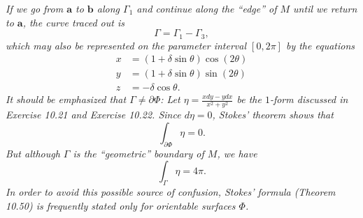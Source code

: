 \documentclass{article}
\begin{document}
\emph{If we go from $\mathbf{a}$ to $\mathbf{b}$ along $\Gamma_1$
and continue along the ``edge'' of $M$ until we return to $\mathbf{a}$,
the curve traced out is
\[
  \Gamma = \Gamma_1 - \Gamma_3,
\]
which may also be represented on the parameter interval $[0,2\pi]$ by the equations
\begin{align*}
  x &= (1+\delta\sin\theta) \cos(2\theta) \\
  y &= (1+\delta\sin\theta) \sin(2\theta) \\
  z &= -\delta\cos\theta.
\end{align*}
It should be emphasized that $\Gamma \neq \partial \Phi$:
Let $\eta = \frac{xdy-ydx}{x^2+y^2}$
be the $1$-form discussed in Exercise 10.21 and Exercise 10.22.
Since $d\eta = 0$, Stokes' theorem shows that
\[
  \int_{\partial \Phi} \eta = 0.
\]
But although $\Gamma$ is the ``geometric'' boundary of $M$, we have
\[
  \int_{\Gamma} \eta = 4 \pi.
\]
In order to avoid this possible source of confusion,
Stokes' formula (Theorem 10.50) is frequently stated only for orientable surfaces $\Phi$.} \\
\end{document}
